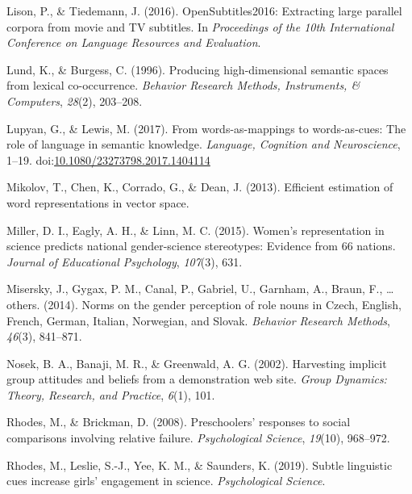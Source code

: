 \documentclass[man,floatsintext]{apa6}
\begin{document}
\leavevmode\hypertarget{ref-lison}{}%
Lison, P., \& Tiedemann, J. (2016). OpenSubtitles2016: Extracting large parallel corpora from movie and TV subtitles. In \emph{Proceedings of the 10th International Conference on Language Resources and Evaluation}.

\leavevmode\hypertarget{ref-lund1996producing}{}%
Lund, K., \& Burgess, C. (1996). Producing high-dimensional semantic spaces from lexical co-occurrence. \emph{Behavior Research Methods, Instruments, \& Computers}, \emph{28}(2), 203--208.

\leavevmode\hypertarget{ref-lupyan2017wordsascues}{}%
Lupyan, G., \& Lewis, M. (2017). From words-as-mappings to words-as-cues: The role of language in semantic knowledge. \emph{Language, Cognition and Neuroscience}, 1--19. doi:\href{https://doi.org/10.1080/23273798.2017.1404114}{10.1080/23273798.2017.1404114}

\leavevmode\hypertarget{ref-mikolov2013efficient}{}%
Mikolov, T., Chen, K., Corrado, G., \& Dean, J. (2013). Efficient estimation of word representations in vector space.

\leavevmode\hypertarget{ref-miller2015women}{}%
Miller, D. I., Eagly, A. H., \& Linn, M. C. (2015). Women's representation in science predicts national gender-science stereotypes: Evidence from 66 nations. \emph{Journal of Educational Psychology}, \emph{107}(3), 631.

\leavevmode\hypertarget{ref-misersky2014norms}{}%
Misersky, J., Gygax, P. M., Canal, P., Gabriel, U., Garnham, A., Braun, F., \ldots{} others. (2014). Norms on the gender perception of role nouns in Czech, English, French, German, Italian, Norwegian, and Slovak. \emph{Behavior Research Methods}, \emph{46}(3), 841--871.

\leavevmode\hypertarget{ref-nosek2002harvesting}{}%
Nosek, B. A., Banaji, M. R., \& Greenwald, A. G. (2002). Harvesting implicit group attitudes and beliefs from a demonstration web site. \emph{Group Dynamics: Theory, Research, and Practice}, \emph{6}(1), 101.

\leavevmode\hypertarget{ref-rhodes2008preschoolers}{}%
Rhodes, M., \& Brickman, D. (2008). Preschoolers' responses to social comparisons involving relative failure. \emph{Psychological Science}, \emph{19}(10), 968--972.

\leavevmode\hypertarget{ref-rhodes2018subtle}{}%
Rhodes, M., Leslie, S.-J., Yee, K. M., \& Saunders, K. (2019). Subtle linguistic cues increase girls' engagement in science. \emph{Psychological Science}.
\end{document}
